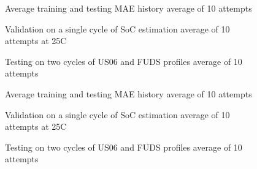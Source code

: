 \begin{figure*}[htbp]
    \centering
    \begin{subfigure}[b]{0.325\textwidth}
        \centering
        
        \caption{Average training and testing MAE history average of 10 attempts}
    \end{subfigure}
    \hfill
    \begin{subfigure}[b]{0.325\textwidth}
        \centering
        
        \caption{Validation on a single cycle of SoC estimation average of 10 attempts at 25\textdegree{}C}
    \end{subfigure}
    \hfill
    \begin{subfigure}[b]{0.325\textwidth}
        \centering
        
        \caption{Testing on two cycles of US06 and FUDS profiles average of 10 attempts}
        \label{subfig:Model-1res-DSTvsFUDS}
    \end{subfigure}
    \begin{subfigure}[b]{0.325\textwidth}
        \centering
        
        \caption{Average training and testing MAE history average of 10 attempts}
    \end{subfigure}
    \hfill
    \begin{subfigure}[b]{0.325\textwidth}
        \centering
        
        \caption{Validation on a single cycle of SoC estimation average of 10 attempts at 25\textdegree{}C}
    \end{subfigure}
    \hfill
    \begin{subfigure}[b]{0.325\textwidth}
        \centering
        
        \caption{Testing on two cycles of US06 and FUDS profiles average of 10 attempts}
    \end{subfigure}
    \begin{subfigure}[b]{0.325\textwidth}

\end{subfigure}
\end{figure*}
